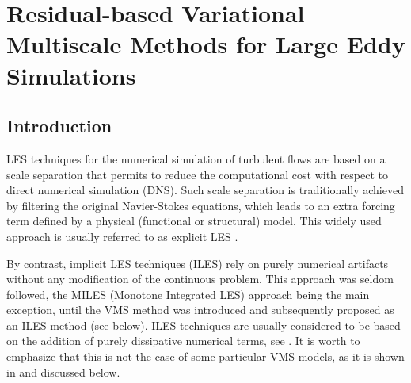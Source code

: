 \chapter{Residual-based Variational Multiscale Methods for Large Eddy Simulations}
\label{chap-Rb_VMS}
\section{Introduction}

LES techniques for the numerical simulation of turbulent flows \cite{Sagaut2006} are based on a scale separation that permits to reduce the computational cost with respect to direct numerical simulation (DNS). Such scale separation is traditionally achieved by filtering the original Navier-Stokes equations, which leads to an extra forcing term defined by a physical (functional or structural) model. This widely used approach is usually referred to as explicit LES \cite{Sagaut2006}.

By contrast, implicit LES techniques (ILES) rely on purely numerical artifacts without any modification of the continuous problem. This approach was seldom followed, the MILES (Monotone Integrated LES) approach \cite{Boris1992,Fureby2002,Grinstein2007} being the main exception, until the VMS method was introduced \cite{hughes_multiscale_1995,hughes_variational_1998} and subsequently proposed as an ILES method (see below). ILES techniques are usually considered to be based on the addition of purely dissipative numerical terms, see  \cite[Section 5.3.4]{Sagaut2006}. It is worth to emphasize that this is not the case of some particular VMS models, as it is shown in \cite{Principe2009} and discussed below.

